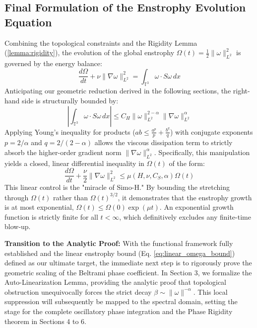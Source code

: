 \documentclass[12pt,a4paper]{article}
\theoremstyle{plain}
\theoremstyle{definition}
\theoremstyle{remark}
\begin{document}
\subsection{Final Formulation of the Enstrophy Evolution Equation}
Combining the topological constraints and the Rigidity Lemma (\ref{lemma:rigidity}), the evolution of the global enstrophy $\Omega(t) = \frac{1}{2}\|\omega\|_{L^2}^2$ is governed by the energy balance:
\begin{equation}
    \frac{d\Omega}{dt} + \nu \|\nabla \omega\|_{L^2}^2 = \int_{\mathbb{T}^3} \omega \cdot S \omega \, dx
\end{equation}
Anticipating our geometric reduction derived in the following sections, the right-hand side is structurally bounded by:
\begin{equation}
    \left| \int_{\mathbb{T}^3} \omega \cdot S \omega \, dx \right| \leq C_H \|\omega\|_{L^2}^{2-\alpha} \|\nabla \omega\|_{L^2}^{\alpha}
\end{equation}
Applying Young’s inequality for products ($ab \leq \frac{a^p}{p} + \frac{b^q}{q}$) with conjugate exponents $p = 2/\alpha$ and $q = 2/(2-\alpha)$ allows the viscous dissipation term to strictly absorb the higher-order gradient norm $\|\nabla\omega\|_{L^2}^\alpha$. Specifically, this manipulation yields a closed, linear differential inequality in $\Omega(t)$ of the form:
\begin{equation}\label{eq:linear_omega_bound}
    \frac{d\Omega}{dt} + \frac{\nu}{2} \|\nabla \omega\|_{L^2}^2 \leq \mu(H, \nu, C_S, \alpha) \Omega(t)
\end{equation}
This linear control is the "miracle of Simo-H." By bounding the stretching through $\Omega(t)$ rather than $\Omega(t)^{3/2}$, it demonstrates that the enstrophy growth is at most exponential, $\Omega(t) \leq \Omega(0) \exp(\mu t)$. An exponential growth function is strictly finite for all $t < \infty$, which definitively excludes any finite-time blow-up.

\vspace{0.5cm}
\noindent\textbf{Transition to the Analytic Proof:} With the functional framework fully established and the linear enstrophy bound (Eq. \ref{eq:linear_omega_bound}) defined as our ultimate target, the immediate next step is to rigorously prove the geometric scaling of the Beltrami phase coefficient. In Section 3, we formalize the Auto-Linearization Lemma, providing the analytic proof that topological obstruction unequivocally forces the strict decay $\beta \sim \|\omega\|^{-\alpha}$. This local suppression will subsequently be mapped to the spectral domain, setting the stage for the complete oscillatory phase integration and the Phase Rigidity theorem in Sections 4 to 6.
\end{document}
